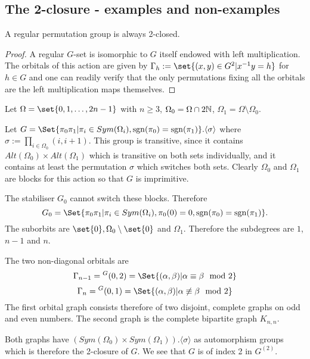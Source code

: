 \documentclass[fontsize=11pt,fleqn,a4paper]{scrartcl}
\begin{document}
\subsection{The 2-closure - examples and non-examples}

\begin{example}\label{two_closure:regular_actions}
A regular permutation group is always 2-closed.
\end{example}
\begin{proof}
A regular $G$-set is isomorphic to $G$ itself endowed with left multiplication. The orbitals of this action are given by $\Gamma_h:=\set{(x,y)\in G^2 | x^{-1}y=h}$ for $h\in G$ and one can readily verify that the only permutations fixing all the orbitals are the left multiplication maps themselves.
\end{proof}

\begin{example}
Let $\Omega=\set{0,1,\ldots,2n-1}$ with $n\geq 3$, $\Omega_0=\Omega\cap 2\mathbb{N}$, $\Omega_1=\Omega\setminus\Omega_0$.

Let $G=\Set{\pi_0\pi_1 | \pi_i\in Sym(\Omega_i), \sgn(\pi_0)=\sgn(\pi_1)}.\langle\sigma\rangle$ where $\sigma:=\prod_{i\in\Omega_0} (i,i+1)$. This group is transitive, since it contains $Alt(\Omega_0)\times Alt(\Omega_1)$ which is transitive on both sets individually, and it contains at least the permutation $\sigma$ which switches both sets. Clearly $\Omega_0$ and $\Omega_1$ are blocks for this action so that $G$ is imprimitive.

The stabiliser $G_0$ cannot switch these blocks. Therefore
\[G_0 = \Set{\pi_0\pi_1 | \pi_i\in Sym(\Omega_i), \pi_0(0)=0, \sgn(\pi_0)=\sgn(\pi_1)}.\]
The suborbits are $\set{0}, \Omega_0\setminus\set{0}$ and $\Omega_1$. Therefore the subdegrees are $1$,$n-1$ and $n$.

The two non-diagonal orbitals are 
\[\Gamma_{n-1} = {^G(0,2)} = \Set{(\alpha,\beta) | \alpha\equiv\beta \mod 2}\]
\[\Gamma_n = {^G(0,1)} = \Set{(\alpha,\beta) | \alpha \not\equiv \beta \mod 2}\]
The first orbital graph consists therefore of two disjoint, complete graphs on odd and even numbers. The second graph is the complete bipartite graph $K_{n,n}$.

Both graphs have $(Sym(\Omega_0)\times Sym(\Omega_1)).\langle\sigma\rangle$ as automorphism groups which is therefore the 2-closure of $G$. We see that $G$ is of index 2 in $G^{(2)}$.
\end{example}
\end{document}
